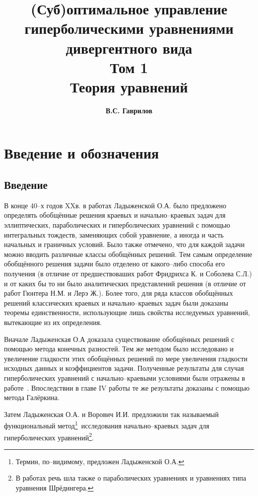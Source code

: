 \documentclass{report}
\begin{document}
\title{\textbf{(Суб)оптимальное управление гиперболическими уравнениями дивергентного вида\\[10mm] Том 1\\[10mm] Теория уравнений}}
\author{\textbf{В.С. Гаврилов}}
\maketitle
\tableofcontents
    \chapter*{Введение и обозначения}
        \section*{Введение}
В конце 40--х годов XXв. в работах Ладыженской О.А. было предложено определять обобщённые решения краевых и начально--краевых задач для эллиптических, параболических и гиперболических
уравнений с помощью интегральных тождеств, заменяющих собой уравнение, а иногда и часть начальных и граничных условий. Было также отмечено, что для каждой задачи можно вводить различные
классы обобщённых решений. Тем самым определение обобщённого решения задачи было отделено от какого--либо способа его получения (в отличие от предшествоваших работ Фридрихса К. и
Соболева С.Л.) и от каких бы то ни было аналитических представлений решения (в отличие от работ Гюнтера Н.М. и Лерэ Ж.). Более того, для ряда классов обобщённых решений классических
краевых и начально--краевых задач были доказаны теоремы единственности, использующие лишь свойства исследуемых уравнений, вытекающие из их определения.

Вначале Ладыженская О.А доказала существование обобщённых решений с помощью метода конечных разностей. Тем же методом было исследовано и увеличение гладкости этих обобщённых решений
по мере увеличения гладкости исходных данных и коэффициентов задачи. Полученные результаты для случая гиперболических уравнений с начально--краевыми условиями были отражены в
работе~\cite{lad1953}. Впоследствии в главе IV работы \cite{lad} те же результаты доказаны с помощью метода Галёркина.

Затем Ладыженская О.А. \cite{Lad1954,Lad1956,Lad1958} и Ворович И.И. \cite{Vorovich} предложили так называемый \glqq функциональный
метод\grqq\footnote{Термин, по--видимому, предложен Ладыженской О.А.}\ исследования начально--краевых задач для гиперболических уравнений\footnote{В работах \cite{Lad1954,Lad1956,Lad1958}
речь шла также о параболических уравнениях и уравнениях типа уравнения Шрёдингера.}.
\end{document}
